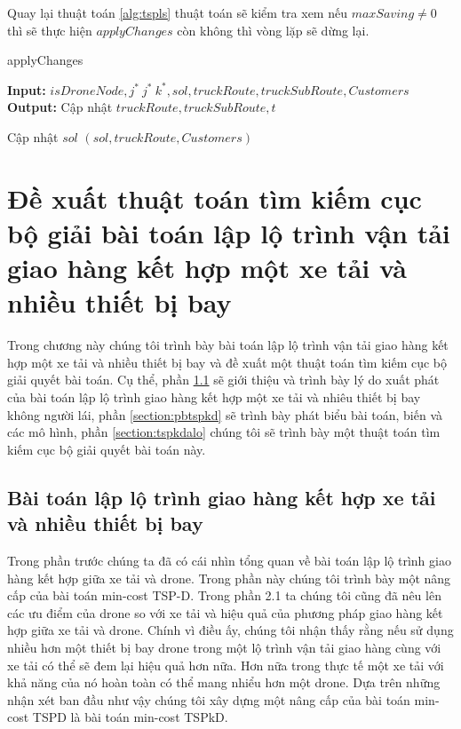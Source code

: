 \documentclass[a4paper,12pt]{report}
\begin{document}
Quay lại thuật toán \ref{alg:tspls} thuật toán sẽ kiểm tra xem nếu $maxSaving \neq 0$ thì sẽ thực hiện $applyChanges$ còn không thì vòng lặp sẽ dừng lại.
\begin{algorithm}[H]
\caption{applyChanges}
\textbf{Input:} $isDroneNode,j^* \ j^* \ k^*,sol,truckRoute,truckSubRoute,Customers$\\
\textbf{Output:} Cập nhật $truckRoute,truckSubRoute,t$\\
\begin{algorithmic}[1]
\Else 
{}
\EndIf
Cập nhật $sol$
\Return 	$(sol,truckRoute,Customers)$
\end{algorithmic}

\label{alg:tspls5}
\end{algorithm}
\chapter{Đề xuất thuật toán tìm kiếm cục bộ  giải bài toán  lập lộ trình vận tải giao hàng kết hợp một xe tải và nhiều thiết bị bay}
\label{chapter:tspkd}
Trong chương này chúng tôi trình bày bài toán lập lộ trình vận tải giao hàng kết hợp một xe tải và nhiều thiết bị bay và đề xuất một thuật toán tìm kiếm cục bộ giải quyết bài toán. Cụ thể, phần \ref{section:intspkd} sẽ giới thiệu và trình bày lý do xuất phát của bài toán lập lộ trình giao hàng kết hợp một xe tải và  nhiêu thiết bị bay không người lái, phần \ref{section:pbtspkd} sẽ trình bày phát biểu bài toán, biến và các mô hình, phần \ref{section:tspkdalo} chúng tôi sẽ trình bày một thuật toán tìm kiếm cục bộ giải quyết bài toán này.
\section{Bài toán lập lộ trình giao hàng kết hợp xe tải và nhiều thiết bị bay}
\label{section:intspkd}
Trong phần trước chúng ta đã có cái nhìn tổng quan về bài toán lập lộ trình giao hàng kết hợp giữa xe tải và drone. Trong phần  này chúng tôi trình bày một nâng cấp của bài toán min-cost TSP-D. Trong phần 2.1 ta chúng tôi cũng đã nêu lên các ưu điểm của drone so với xe tải và hiệu quả của phương pháp giao hàng kết hợp giữa xe tải và drone. Chính vì điều ấy, chúng tôi nhận thấy rằng nếu sử dụng nhiều hơn một thiết bị bay drone trong một lộ trình vận tải giao hàng cùng với xe tải có thể sẽ đem lại hiệu quả hơn nữa. Hơn nữa trong thực tế một xe tải với khả năng của nó hoàn toàn có thể mang nhiểu hơn một drone. Dựa trên những nhận xét ban đầu như vậy chúng tôi xây dựng một nâng cấp của bài toán min-cost TSPD là bài toán min-cost TSPkD.
\end{document}
